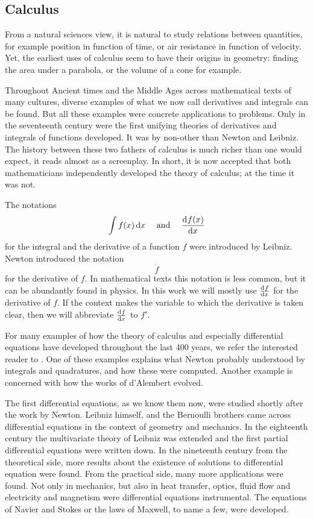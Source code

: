 \subsection{Calculus}

From a natural sciences view, it is natural to study relations between quantities, for example position in function of time, or air resistance in function of velocity. Yet, the earliest uses of calculus seem to have their origins in geometry: finding the area under a parabola, or the volume of a cone for example.

Throughout Ancient times and the Middle Ages across mathematical texts of many cultures, diverse examples of what we now call derivatives and integrals can be found. But all these examples were concrete applications to problems. Only in the seventeenth century were the first unifying theories of derivatives and integrals of functions developed. It was by non-other than Newton and Leibniz. The history between these two fathers of calculus is much richer than one would expect, it reads almost as a screenplay. In short, it is now accepted that both mathematicians independently developed the theory of calculus; at the time it was not.

The notations
$$
    \int f(x) \, \dd x \quad \text{ and } \quad \dv[]{f(x)}{x}
$$
for the integral and the derivative of a function $f$ were introduced by Leibniz. Newton introduced the notation
$$
    \dot{f}
$$
for the derivative of $f$. In mathematical texts this notation is less common, but it can be abundantly found in physics. In this work we will mostly use $\dv[]{f}{x}$ for the derivative of $f$. If the context makes the variable to which the derivative is taken clear, then we will abbreviate $\dv[]{f}{x}$ to $f'$.

For many examples of how the theory of calculus and especially differential equations have developed throughout the last 400 years, we refer the interested reader to \cite{archibald_history_2005}. One of these examples explains what Newton probably understood by integrals and quadratures, and how these were computed. Another example is concerned with how the works of d'Alembert evolved.


The first differential equations, as we know them now, were studied shortly after the work by Newton. Leibniz himself, and the Bernoulli brothers came across differential equations in the context of geometry and mechanics. In the eighteenth century the multivariate theory of Leibniz was extended and the first partial differential equations were written down. In the nineteenth century from the theoretical side, more results about the existence of solutions to differential equation were found. From the practical side, many more applications were found. Not only in mechanics, but also in heat transfer, optics, fluid flow and electricity and magnetism were differential equations instrumental. The equations of Navier and Stokes or the laws of Maxwell, to name a few, were developed.

